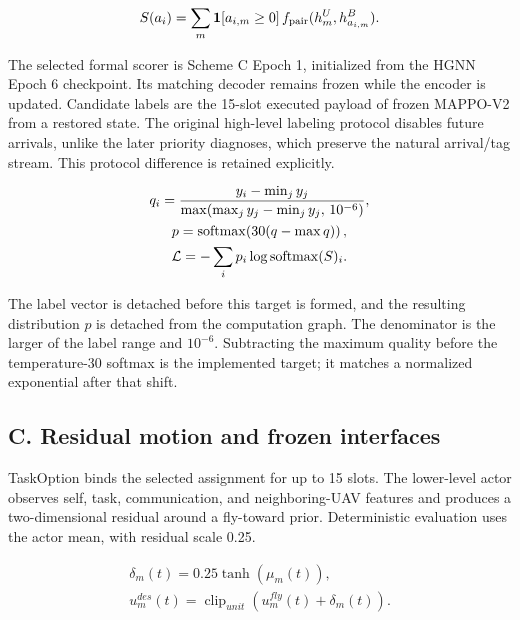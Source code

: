 \begin{equation*}
\begin{gathered}
S(a_i)=\sum_m {\bf1}[a_{i,m}\ge0]\, f_{\rm pair}(h_m^U,h_{a_{i,m}}^B).
\end{gathered}
\end{equation*}

The selected formal scorer is Scheme C Epoch 1, initialized from the HGNN Epoch 6 checkpoint. Its matching decoder remains frozen while the encoder is updated. Candidate labels are the 15-slot executed payload of frozen MAPPO-V2 from a restored state. The original high-level labeling protocol disables future arrivals, unlike the later priority diagnoses, which preserve the natural arrival/tag stream. This protocol difference is retained explicitly.

\begin{equation*}
\begin{gathered}
q_i={y_i-\min_j y_j\over \max(\max_j y_j-\min_j y_j,\,10^{-6})},\\
p=\operatorname{softmax}\!\left(30(q-\max q)\right),\\
{\cal L}=-\sum_i p_i\log\operatorname{softmax}(S)_i.
\end{gathered}
\end{equation*}

The label vector is detached before this target is formed, and the resulting distribution $p$ is detached from the computation graph. The denominator is the larger of the label range and $10^{-6}$. Subtracting the maximum quality before the temperature-30 softmax is the implemented target; it matches a normalized exponential after that shift.

\subsection*{C. Residual motion and frozen interfaces}

TaskOption binds the selected assignment for up to 15 slots. The lower-level actor observes self, task, communication, and neighboring-UAV features and produces a two-dimensional residual around a fly-toward prior. Deterministic evaluation uses the actor mean, with residual scale 0.25.

\begin{equation*}
\begin{gathered}
\delta_m(t)=0.25\tanh(\mu_m(t)),\\ u_m^{des}(t)=\operatorname{clip}_{unit}(u_m^{fly}(t)+\delta_m(t)).
\end{gathered}
\end{equation*}

